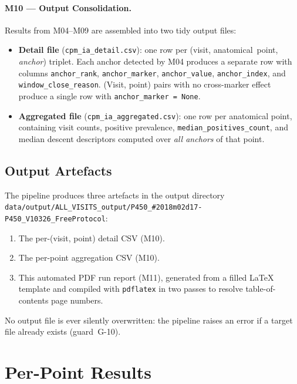 \documentclass[a4paper,11pt]{article}
\begin{document}
\paragraph{M10 --- Output Consolidation.}
Results from M04--M09 are assembled into two tidy output files:
\begin{itemize}
  \item \textbf{Detail file} (\texttt{cpm\_ia\_detail.csv}): one row per
        (visit, anatomical~point, \emph{anchor}) triplet. Each anchor detected by M04
        produces a separate row with columns \texttt{anchor\_rank},
        \texttt{anchor\_marker}, \texttt{anchor\_value}, \texttt{anchor\_index},
        and \texttt{window\_close\_reason}.
        (Visit, point) pairs with no cross-marker effect produce a single row with
        \texttt{anchor\_marker = None}.
  \item \textbf{Aggregated file} (\texttt{cpm\_ia\_aggregated.csv}): one row per
        anatomical point, containing visit counts, positive prevalence,
        \texttt{median\_positives\_count}, and median descent descriptors computed over
        \emph{all anchors} of that point.
\end{itemize}

\subsection{Output Artefacts}

The pipeline produces three artefacts in the output directory \texttt{data/output/ALL\_VISITS\_output/P450\_\#2018m02d17-P450\_V10326\_FreeProtocol}:
\begin{enumerate}
  \item The per-(visit, point) detail CSV (M10).
  \item The per-point aggregation CSV (M10).
  \item This automated PDF run report (M11), generated from a filled \LaTeX{} template
        and compiled with \texttt{pdflatex} in two passes to resolve table-of-contents
        page numbers.
\end{enumerate}
No output file is ever silently overwritten: the pipeline raises an error if a target
file already exists (guard~G-10).

\section{Per-Point Results}
\end{document}
